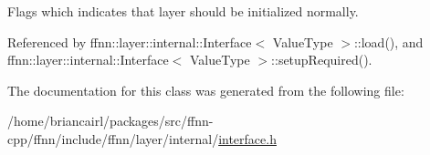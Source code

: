 Flags which indicates that layer should be initialized normally. 



Referenced by ffnn\-::layer\-::internal\-::\-Interface$<$ Value\-Type $>$\-::load(), and ffnn\-::layer\-::internal\-::\-Interface$<$ Value\-Type $>$\-::setup\-Required().



The documentation for this class was generated from the following file\-:\begin{DoxyCompactItemize}
\item 
/home/briancairl/packages/src/ffnn-\/cpp/ffnn/include/ffnn/layer/internal/\hyperlink{interface_8h}{interface.\-h}\end{DoxyCompactItemize}

